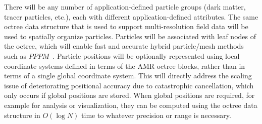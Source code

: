 \documentclass[11pt,letterpaper]{article}
\begin{document}
%
There will be any number of application-defined particle groups (dark matter,
tracer particles, etc.), each with different 
application-defined attributes.
%
The same octree data structure that is used to support
multi-resolution field data will be used to spatially organize
particles.  Particles will be associated with leaf nodes of the
octree, which will enable fast and accurate hybrid particle/mesh
methods such as $PPPM$~\cite{HoEa88}.
%
Particle positions will be optionally represented using local
coordinate systems defined in terms of the AMR octree blocks, rather
than in terms of a single global coordinate system.
This will directly address the scaling issue of deteriorating positional accuracy
due to catastrophic cancellation, which only occurs if
global positions are stored.  When global positions are required, for
example for analysis or visualization, they can be computed using the
octree data structure in $O(\log N)$ time to whatever precision or
range is necessary.



\end{document}
